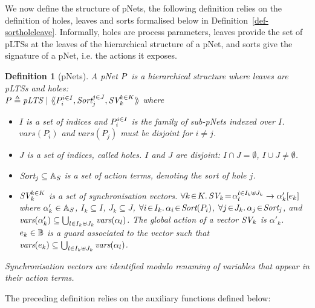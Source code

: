 \documentclass{lmcs}
\newtheorem{definition}{Definition}
\begin{document}
We now define the structure of pNets, the following definition relies on the definition 
of holes, leaves and sorts formalised below in Definition~\ref{def-sortholeleave}. Informally, holes are process parameters, leaves provide the set of pLTSs at the leaves of the hierarchical structure of a pNet, and sorts give the signature of a pNet, i.e. the actions it exposes.

\begin{definition}[pNets]\label{def-pnets}
A pNet $P$ is a hierarchical structure where leaves are pLTSs and holes:\\
$\pNet\triangleq \pLTS~|~\mylangle \pNet_i^{i\in I}, \Sort_j^{j\in J}, \symb{SV}_k^{k\in 
K}\myrangle$
where
\begin{itemize}
\item[$\bullet$] $I$ is a set of indices and $P_i^{i\in I}$ is the family of sub-pNets indexed over $I$. $vars(P_i)$ and $vars(P_j)$ must be disjoint for $i\neq j$.

\item[$\bullet$] $J$ is a set of indices, called \emph{holes}.
$I$ and $J$ are \emph{disjoint}: $I\!\cap\! J=\emptyset$,  $I\!\cup\! J\neq\emptyset$.
\item[$\bullet$] $\Sort_j \subseteq \AlgAS$  is a set of action terms, denoting the 
\emph{sort} of
hole $j$.

\item[$\bullet$] $\symb{SV}_k^{k\in K}$ is a set of
  synchronisation vectors. $\forall k\!\in\! K.\,
  \symb{SV}_k\!=\!\SV{\alpha_{l}^{l\in I_k \uplus J_k}}{\alpha'_k}{e_k}$ where
  $\alpha'_k\in \mathbb{A}_S$, $I_k\subseteq I$, $J_k\subseteq J$,
  $\forall i\!\in\!
  I_k.\,\alpha_{i}\!\in\!\Sort(\pNet_i)$,  $\forall j\!\in\!
  J_k.\,\alpha_{j}\!\in\!\Sort_j$, and $\vars(\alpha'_k)\subseteq \bigcup_{l\in I_k\uplus 
  J_k}{\vars({\alpha_l})}$. The global action of a vector $\symb{SV}_k$ is
$\alpha'_k$. $e_k \in \mathbb{B}$ is a guard associated to the vector such that
$\vars(e_k)\subseteq \bigcup_{l\in I_k\uplus J_k}{\vars({\alpha_l})}$.
\end{itemize}
Synchronisation vectors are identified modulo renaming of variables that appear in their 
action terms.
\end{definition}

The preceding definition relies on the auxiliary functions defined below:
\end{document}
